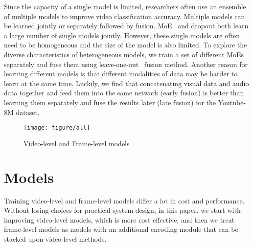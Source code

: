 \documentclass[10pt,twocolumn,letterpaper]{article}
\begin{document}
Since the capacity of a single model is limited, researchers often use an ensemble of multiple models to improve video classification accuracy. Multiple models can be learned jointly or separately followed by fusion. MoE~\cite{jacobs1991adaptive} and dropout \cite{srivastava2014dropout} both learn a large number of single models jointly. However, these single models are often need to be homogeneous and the size of the model is also limited. To explore the diverse characteristics of heterogeneous models, we train a set of different MoEs separately and fuse them using leave-one-out~\cite{lan2013cmu} fusion method. Another reason for learning different models is that different modalities of data may be harder to learn at the same time.  
Luckily, we find that concatenating visual data and audio data together and feed them into the same network (early fusion) is better than learning them separately and fuse the results later (late fusion) for the Youtube-8M dataset. 




\begin{figure}
    \centering
    \texttt{[image: figure/all]}
    \caption{Video-level and Frame-level models}
    \label{fig:all}
\end{figure}

\section{Models} 
Training video-level and frame-level models differ a lot in cost and performance. Without losing choices for practical system design, in this paper, we start with improving video-level models, which is more cost effective, and then we treat frame-level models as models with an additional encoding module that can be stacked upon video-level methods.
\end{document}
